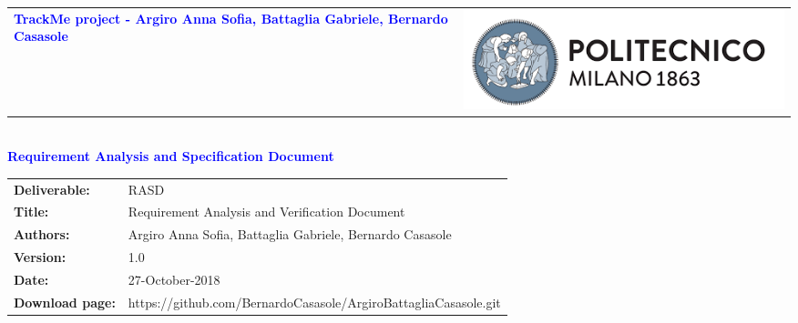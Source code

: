 




\begin{titlepage}


{\begin{table}[t!]
\centering
\begin{tabu} to \textwidth { X[1.3,r,p] X[1.7,l,p] }
\textcolor{Blue}{\textbf{\small{TrackMe project - Argiro Anna Sofia, Battaglia Gabriele, Bernardo Casasole}}} & \includegraphics[scale=0.5]{images/PolimiLogo}
\end{tabu}
\end{table}}~\\ [7cm]


\centering
{\textcolor{Blue}{\textbf{\Huge{Requirement Analysis and Specification Document}}}} \\ [1cm]

\end{titlepage}

\begin{table}[h!]
\begin{tabu} to \textwidth { X[0.3,r,p] X[0.7,l,p] }
\hline

\textbf{Deliverable:} & RASD\\
\textbf{Title:} & Requirement Analysis and Verification Document \\
\textbf{Authors:} & Argiro Anna Sofia, Battaglia Gabriele, Bernardo Casasole \\
\textbf{Version:} & 1.0 \\ 
\textbf{Date:} & 27-October-2018 \\
\textbf{Download page:} & https://github.com/BernardoCasasole/ArgiroBattagliaCasasole.git \\
\hline
\end{tabu}
\end{table}

\setcounter{page}{2}

\newpage
{}
\tableofcontents


